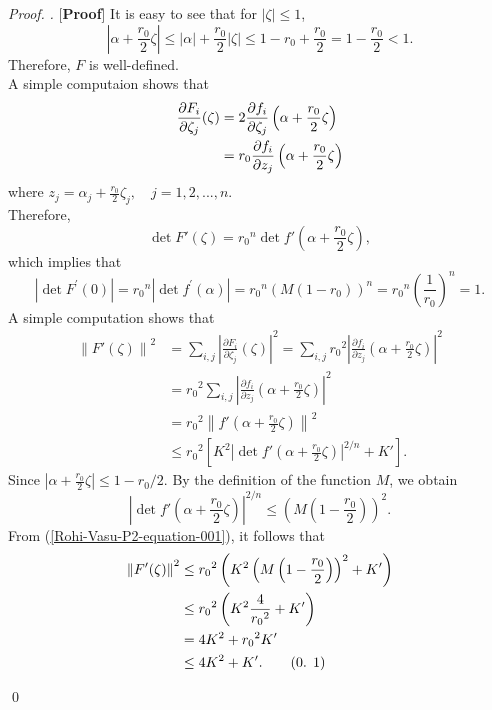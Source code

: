 \documentclass[a4paper,12pt,reqno]{amsart}
\theoremstyle{plain}
\newcommand\numberthis{\addtocounter{equation}{1}\tag{\theequation}}
\theoremstyle{definition}
\newenvironment{pf}[1][]{%
	\vskip 3mm
	\noindent
	\ifthenelse{\equal{#1}{}}%
	{{\slshape Proof. }}%
	{{\slshape #1.} }%
}%
{\qed\bigskip}
\renewcommand{\theequation}{\thesection.
\arabic{equation}}
\numberwithin{equation}{section}
\begin{document}
\begin{pf} [{\bf Proof}]
\vspace{2mm}
It is easy to see that  for $|\zeta| \leq 1$,
$$
\left|\alpha+\frac{r_0}{2} \zeta\right| \leq|\alpha|+\frac{r_0}{2}|\zeta| \leq 1-r_0+\frac{r_0}{2}=1-\frac{r_0}{2}<1.
$$
Therefore, $F$ is well-defined.\\
A simple computaion shows that
$$
\begin{aligned}
\frac{\partial F_i}{\partial \zeta_j}(\zeta) & =2\frac{\partial f_i}{\partial \zeta_j}\left(\alpha+\frac{r_0}{2} \zeta\right) \\ \vspace{2mm}
& =r_0\frac{\partial f_i}{\partial z_j}\left(\alpha+\frac{r_0}{2} \zeta\right)
\end{aligned}
$$
where $z_j=\alpha_j+\frac{r_0}{2}\zeta_j, \quad j=1,2,...,n.$\\
Therefore,$$ \operatorname{det} F'(\zeta)={r_0}^n \operatorname{det} f'\left(\alpha+\frac{r_0}{2} \zeta\right), 
$$
which implies that
$$
\left|\operatorname{det} F^{\prime}(0)\right|={r_0}^n\left|\operatorname{det} f^{\prime}(\alpha)\right|={r_0}^n\left(M\left(1-r_0\right)\right)^n={r_0}^n\left(\frac{1}{r_0}\right)^n 
=1.
$$
A simple computation shows that
$$
\begin{aligned}
\left\|F'(\zeta)\right\|^2 & =\sum_{i, j}\left|\frac{\partial F_i}{\partial \zeta_j}(\zeta)\right|^2=\sum_{i, j}{r_0}^2\left|\frac{\partial f_i}{\partial z_j}\left(\alpha+\frac{r_0}{2} \zeta\right)\right|^2 \\
& ={r_0}^2 \sum_{i, j}\left|\frac{\partial f_i}{\partial z_j}\left(\alpha+\frac{r_0}{2} \zeta\right)\right|^2 \\
& ={r_0}^2\left\|f'\left(\alpha+\frac{r_0}{2} \zeta\right)\right\|^2 \\
& \leq {r_0}^2\left[K^2\left|\operatorname{det} f'\left(\alpha+\frac{r_0}{2} \zeta\right)\right|^{2 / n}+K'\right].
\end{aligned}
$$
Since
$\left|\alpha+\frac{r_0}{2} \zeta\right| \leq 1-r_0/2$. By the definition of the function $M$, we obtain
$$
\left|\operatorname{det} f'\left(\alpha+\frac{r_0}{2} \zeta\right)\right|^{2 / n} \leq\left(M\left(1-\frac{r_0}{2}\right)\right)^2.
$$
From (\ref{Rohi-Vasu-P2-equation-001}), it follows that
\begin{align*}\label{Rohi-Vasu-P2-equation-002}
\left\|F'(\zeta)\right\|^2 &\leq {r_0}^2\left(K^2\left(M\left(1-\frac{r_0}{2}\right)\right)^2+K'\right) \\
&\leq{r_0}^2\left(K^2  \frac{4}{{r_0}^2}+K'\right)\\
& =4K^2+{r_0}^2 K' \\
& \leq 4K^2+K'.\numberthis
\end{align*}


\end{pf}
\end{document}
